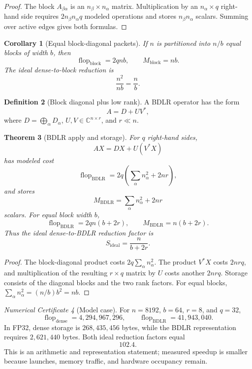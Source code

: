 \documentclass[11pt]{article}
\newtheorem{theorem}{Theorem}[section]
\newtheorem{corollary}[theorem]{Corollary}
\theoremstyle{definition}
\newtheorem{definition}[theorem]{Definition}
\theoremstyle{remark}
\newtheorem{certificate}[theorem]{Numerical Certificate}
\newcommand{\bbC}{\mathbb C}
\newcommand{\flop}{\operatorname{flop}}
\begin{document}
\begin{proof}
The block $A_{\beta\alpha}$ is an $n_\beta\times n_\alpha$ matrix. Multiplication by an $n_\alpha\times q$ right-hand side requires $2n_\beta n_\alpha q$ modeled operations and stores $n_\beta n_\alpha$ scalars. Summing over active edges gives both formulas.
\end{proof}

\begin{corollary}[Equal block-diagonal packets]
If $n$ is partitioned into $n/b$ equal blocks of width $b$, then
\[
\flop_{\mathrm{block}}=2qnb,
\qquad
M_{\mathrm{block}}=nb.
\]
The ideal dense-to-block reduction is
\[
\boxed{
\frac{n^2}{nb}=\frac{n}{b}.
}
\]
\end{corollary}

\begin{definition}[Block diagonal plus low rank]
A BDLR operator has the form
\[
\boxed{
A=D+UV^*,
}
\]
where $D=\bigoplus_\alpha D_\alpha$, $U,V\in\bbC^{n\times r}$, and $r\ll n$.
\end{definition}

\begin{theorem}[BDLR apply and storage]
For $q$ right-hand sides,
\[
AX=DX+U(V^*X)
\]
has modeled cost
\[
\boxed{
\flop_{\mathrm{BDLR}}
 =2q\left(\sum_\alpha n_\alpha^2+2nr\right),
}
\]
and stores
\[
\boxed{
M_{\mathrm{BDLR}}
 =\sum_\alpha n_\alpha^2+2nr
}
\]
scalars. For equal block width $b$,
\[
\boxed{
\flop_{\mathrm{BDLR}}=2qn(b+2r),
\qquad
M_{\mathrm{BDLR}}=n(b+2r).
}
\]
Thus the ideal dense-to-BDLR reduction factor is
\[
\boxed{
S_{\mathrm{ideal}}=\frac{n}{b+2r}.
}
\]
\end{theorem}

\begin{proof}
The block-diagonal product costs $2q\sum_\alpha n_\alpha^2$. The product $V^*X$ costs $2nrq$, and multiplication of the resulting $r\times q$ matrix by $U$ costs another $2nrq$. Storage consists of the diagonal blocks and the two rank factors. For equal blocks, $\sum_\alpha n_\alpha^2=(n/b)b^2=nb$.
\end{proof}

\begin{certificate}[Model case]
For $n=8192$, $b=64$, $r=8$, and $q=32$,
\[
\flop_{\mathrm{dense}}=4{,}294{,}967{,}296,
\qquad
\flop_{\mathrm{BDLR}}=41{,}943{,}040.
\]
In FP32, dense storage is $268{,}435{,}456$ bytes, while the BDLR representation requires $2{,}621{,}440$ bytes. Both ideal reduction factors equal
\[
\boxed{102.4.}
\]
This is an arithmetic and representation statement; measured speedup is smaller because launches, memory traffic, and hardware occupancy remain.
\end{certificate}
\end{document}
